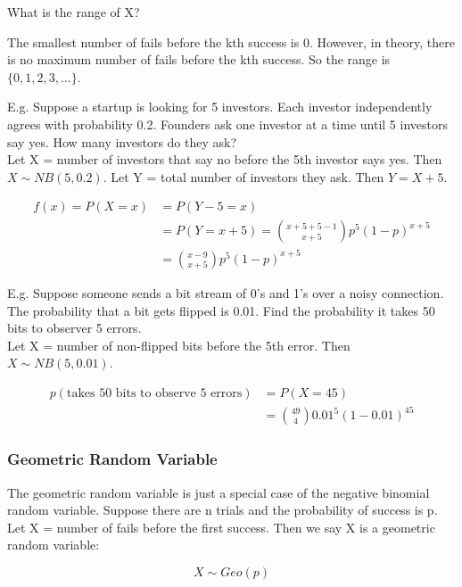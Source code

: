 \documentclass[12pt, letterpaper]{article}
\begin{document}
What is the range of X?

The smallest number of fails before the kth success is 0. However, in theory, there is no maximum number of fails before the kth success. So the range is \(\{0, 1, 2, 3, ...\}\).

E.g. Suppose a startup is looking for 5 investors. Each investor independently agrees with probability 0.2. Founders ask one investor at a time until 5 investors say yes. How many investors do they ask?\\

Let X = number of investors that say no before the 5th investor says yes. Then \(X \sim NB(5, 0.2)\). Let Y = total number of investors they ask. Then \(Y = X + 5\).

\begin{align*}
f\left(x\right) = P\left(X = x\right)
&= P\left(Y - 5 = x\right)\\
&= P\left(Y = x + 5\right) = {{x + 5 + 5 - 1} \choose {x + 5}}p^5 (1 - p)^{x + 5}\\
&= {{x - 9} \choose {x + 5}}p^5 (1 - p)^{x + 5}
\end{align*}

E.g. Suppose someone sends a bit stream of 0's and 1's over a noisy connection. The probability that a bit gets flipped is 0.01. Find the probability it takes 50 bits to observer 5 errors.\\

Let X = number of non-flipped bits before the 5th error. Then \(X \sim NB(5, 0.01)\).

\begin{align*}
p\left(\text{takes 50 bits to observe 5 errors}\right)
&= P\left(X = 45\right)\\
&= {{49} \choose {4}}0.01^5 (1 - 0.01)^{45}
\end{align*}

\subsubsection{Geometric Random Variable}
The geometric random variable is just a special case of the negative binomial random variable. Suppose there are n trials and the probability of success is p. Let X = number of fails before the first success. Then we say X is a geometric random variable:

\begin{equation}
X \sim Geo(p)
\end{equation}\\
 
\end{document}
